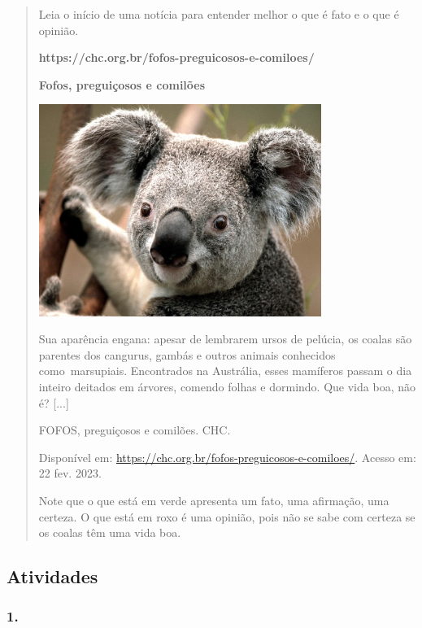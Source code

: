 \begin{quote}
Leia o início de uma notícia para entender melhor o que é fato e o que é
opinião.

\textbf{https://chc.org.br/fofos-preguicosos-e-comiloes/}

\textbf{Fofos, preguiçosos e comilões}

\includegraphics[width=3.61389in,height=2.71042in]{media/image25.jpeg}

Sua aparência engana: apesar de lembrarem ursos de pelúcia, os coalas
são parentes dos cangurus, gambás e outros animais conhecidos
como~marsupiais. Encontrados na Austrália, esses mamíferos passam o dia
inteiro deitados em árvores, comendo folhas e dormindo. Que vida boa,
não é? {[}...{]}

FOFOS, preguiçosos e comilões. CHC.

Disponível em: \url{https://chc.org.br/fofos-preguicosos-e-comiloes/}.
Acesso em: 22 fev. 2023.

Note que o que está em verde apresenta um fato, uma afirmação, uma
certeza. O que está em roxo é uma opinião, pois não se sabe com certeza
se os coalas têm uma vida boa.
\end{quote}

\subsection{Atividades}\label{atividades-7}

\subsubsection{1. }\label{section-60}

